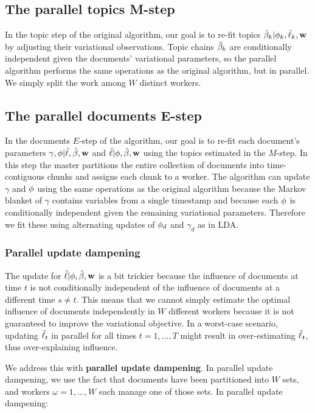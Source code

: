 \subsection*{The parallel topics M-step}
In the topic step of the original algorithm, our goal is to re-fit
topics $\tilde{\beta}_k | \phi_k, \tilde{\ell}_k, \textbf{w}$ by adjusting their variational
observations.  Topic chains $\tilde{\beta}_k$ are conditionally independent
given the documents' variational parameters, so the parallel algorithm
performs the same operations as the original algorithm, but in
parallel.  We simply split the work among $W$ distinct workers.

\subsection*{The parallel documents E-step}
In the documents $E$-step of the algorithm, our goal is to re-fit each
document's parameters $\gamma, \phi | \tilde{\ell}, \tilde{\beta}, \textbf{w}$ and $\tilde{\ell} |
\phi, \tilde{\beta}, \textbf{w} $ using the topics estimated in the $M$-step.  In this
step the master partitions the entire collection of documents into
time-contiguous chunks and assigns each chunk to a worker. The
algorithm can update $\gamma$ and $\phi$ using the same operations as
the original algorithm because the Markov blanket of $\gamma$ contains
variables from a single timestamp and because each $\phi$ is
conditionally independent given the remaining variational parameters.
Therefore we fit these using alternating updates of $\phi_{d}$ and
$\gamma_d$ as in LDA.

\subsubsection*{Parallel update dampening}
The update for $\tilde{\ell} | \phi, \tilde{\beta}, \textbf{w}$ is a bit trickier because the
influence of documents at time $t$ is not conditionally independent of
the influence of documents at a different time $s \neq t$.  This means
that we cannot simply estimate the optimal influence of documents
independently in $W$ different workers because it is not guaranteed to
improve the variational objective.  In a worst-case scenario, updating
$\tilde{\ell}_t$ in parallel for all times $t=1, \ldots, T$ might result in
over-estimating $\tilde{\ell}_t$, thus over-explaining influence.

We address this with \textbf{parallel update dampening}.  In parallel
update dampening, we use the fact that documents have been partitioned into
$W$ sets, and workers $\omega = 1, \ldots, W$ each manage one of those
sets.  In parallel update dampening:

